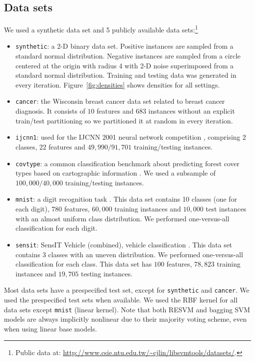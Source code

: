 \documentclass[preprint,elsarticle-num,12pt]{elsarticle}
\begin{document}
\subsection{Data sets} \label{data} 
We used a synthetic data set and 5 publicly available data sets:\footnote{Public data at: \url{http://www.csie.ntu.edu.tw/~cjlin/libsvmtools/datasets/}.}
\begin{itemize}
\item \texttt{synthetic}: a 2-D binary data set. Positive instances are sampled from a standard normal distribution. Negative instances are sampled from a circle centered at the origin with radius 4 with 2-D noise superimposed from a standard normal distribution. Training and testing data was generated in every iteration. Figure~\ref{fig:densities} shows densities for all settings. 
\item \texttt{cancer}: the Wisconsin breast cancer data set related to breast cancer diagnosis. It consists of $10$ features and $683$ instances without an explicit train/test partitioning so we partitioned it at random in every iteration.
\item \texttt{ijcnn1}: used for the IJCNN 2001 neural network competition \citep{prokhorov2001ijcnn}, comprising $2$ classes, $22$ features and $49,990/91,701$ training/testing instances.
\item \texttt{covtype}: a common classification benchmark about predicting forest cover types based on cartographic information \citep{Blackard00covtype}. We used a subsample of $100,000/40,000$ training/testing instances.
\item \texttt{mnist}: a digit recognition task \citep{Lecun98gradient-basedlearning}. This data set contains 10 classes (one for each digit), $780$ features, $60,000$ training instances and $10,000$ test instances with an almost uniform class distribution. We performed one-versus-all classification for each digit.
\item \texttt{sensit}: SensIT Vehicle (combined), vehicle classification \citep{duarte2004vehicle}. This data set contains 3 classes with an uneven distribution. We performed one-versus-all classification for each class. This data set has $100$ features, $78,823$ training instances and $19,705$ testing instances.
\end{itemize}

Most data sets have a prespecified test set, except for \texttt{synthetic} and \texttt{cancer}. We used the prespecified test sets when available. We used the RBF kernel for all data sets except \texttt{mnist} (linear kernel). Note that both RESVM and bagging SVM models are always implicitly nonlinear due to their majority voting scheme, even when using linear base models.
\end{document}
